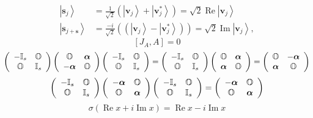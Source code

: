 \documentclass[aps,preprint]{revtex4}%
\begin{document}
\begin{align}
\left\vert \mathbf{s}_{j}\right\rangle  &  =\frac{1}{\sqrt{2}}\left(
\left\vert \mathbf{v}_{j}\right\rangle +\left\vert \mathbf{v}_{j}^{\ast
}\right\rangle \right)  =\sqrt{2}\operatorname{Re}\left\vert \mathbf{v}%
_{j}\right\rangle \nonumber\\
\left\vert \mathbf{s}_{j+\mathbf{s}}\right\rangle  &  =\frac{-i}{\sqrt{2}%
}\left(  \left(  \left\vert \mathbf{v}_{j}\right\rangle -\left\vert
\mathbf{v}_{j}^{\ast}\right\rangle \right)  \right)  =\sqrt{2}%
\operatorname{Im}\left\vert \mathbf{v}_{j}\right\rangle ,
\end{align}%
\begin{equation}
\left[  J_{A},A\right]  =0
\end{equation}%
\begin{equation}
\left(
\begin{array}
[c]{cc}%
-\mathbb{I}_{s} & \mathbb{O}\\
\mathbb{O} & \mathbb{I}_{s}%
\end{array}
\right)  \left(
\begin{array}
[c]{cc}%
\mathbb{O} & \boldsymbol{\alpha}\\
-\boldsymbol{\alpha} & \mathbb{O}%
\end{array}
\right)  \left(
\begin{array}
[c]{cc}%
-\mathbb{I}_{s} & \mathbb{O}\\
\mathbb{O} & \mathbb{I}_{s}%
\end{array}
\right)  =\left(
\begin{array}
[c]{cc}%
-\mathbb{I}_{s} & \mathbb{O}\\
\mathbb{O} & \mathbb{I}_{s}%
\end{array}
\right)  \left(
\begin{array}
[c]{cc}%
\mathbb{O} & \boldsymbol{\alpha}\\
\boldsymbol{\alpha} & \mathbb{O}%
\end{array}
\right)  =\left(
\begin{array}
[c]{cc}%
\mathbb{O} & -\boldsymbol{\alpha}\\
\boldsymbol{\alpha} & \mathbb{O}%
\end{array}
\right)
\end{equation}%
\begin{equation}
\left(
\begin{array}
[c]{cc}%
-\mathbb{I}_{s} & \mathbb{O}\\
\mathbb{O} & \mathbb{I}_{s}%
\end{array}
\right)  \left(
\begin{array}
[c]{cc}%
-\boldsymbol{\alpha} & \mathbb{O}\\
\mathbb{O} & \boldsymbol{\alpha}%
\end{array}
\right)  \left(
\begin{array}
[c]{cc}%
-\mathbb{I}_{s} & \mathbb{O}\\
\mathbb{O} & \mathbb{I}_{s}%
\end{array}
\right)  =\left(
\begin{array}
[c]{cc}%
-\boldsymbol{\alpha} & \mathbb{O}\\
\mathbb{O} & \boldsymbol{\alpha}%
\end{array}
\right)
\end{equation}%
\begin{equation}
\sigma\left(  \operatorname{Re}x+i\operatorname{Im}x\right)
=\operatorname{Re}x-i\operatorname{Im}x
\end{equation}
\end{document}
